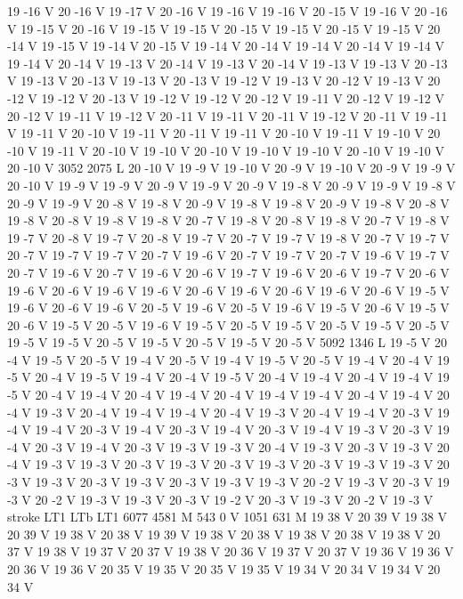 {{19 -16 V
20 -16 V
19 -17 V
20 -16 V
19 -16 V
19 -16 V
20 -15 V
19 -16 V
20 -16 V
19 -15 V
20 -16 V
19 -15 V
19 -15 V
20 -15 V
19 -15 V
20 -15 V
19 -15 V
20 -14 V
19 -15 V
19 -14 V
20 -15 V
19 -14 V
20 -14 V
19 -14 V
20 -14 V
19 -14 V
19 -14 V
20 -14 V
19 -13 V
20 -14 V
19 -13 V
20 -14 V
19 -13 V
19 -13 V
20 -13 V
19 -13 V
20 -13 V
19 -13 V
20 -13 V
19 -12 V
19 -13 V
20 -12 V
19 -13 V
20 -12 V
19 -12 V
20 -13 V
19 -12 V
19 -12 V
20 -12 V
19 -11 V
20 -12 V
19 -12 V
20 -12 V
19 -11 V
19 -12 V
20 -11 V
19 -11 V
20 -11 V
19 -12 V
20 -11 V
19 -11 V
19 -11 V
20 -10 V
19 -11 V
20 -11 V
19 -11 V
20 -10 V
19 -11 V
19 -10 V
20 -10 V
19 -11 V
20 -10 V
19 -10 V
20 -10 V
19 -10 V
19 -10 V
20 -10 V
19 -10 V
20 -10 V
3052 2075 L
20 -10 V
19 -9 V
19 -10 V
20 -9 V
19 -10 V
20 -9 V
19 -9 V
20 -10 V
19 -9 V
19 -9 V
20 -9 V
19 -9 V
20 -9 V
19 -8 V
20 -9 V
19 -9 V
19 -8 V
20 -9 V
19 -9 V
20 -8 V
19 -8 V
20 -9 V
19 -8 V
19 -8 V
20 -9 V
19 -8 V
20 -8 V
19 -8 V
20 -8 V
19 -8 V
19 -8 V
20 -7 V
19 -8 V
20 -8 V
19 -8 V
20 -7 V
19 -8 V
19 -7 V
20 -8 V
19 -7 V
20 -8 V
19 -7 V
20 -7 V
19 -7 V
19 -8 V
20 -7 V
19 -7 V
20 -7 V
19 -7 V
19 -7 V
20 -7 V
19 -6 V
20 -7 V
19 -7 V
20 -7 V
19 -6 V
19 -7 V
20 -7 V
19 -6 V
20 -7 V
19 -6 V
20 -6 V
19 -7 V
19 -6 V
20 -6 V
19 -7 V
20 -6 V
19 -6 V
20 -6 V
19 -6 V
19 -6 V
20 -6 V
19 -6 V
20 -6 V
19 -6 V
20 -6 V
19 -5 V
19 -6 V
20 -6 V
19 -6 V
20 -5 V
19 -6 V
20 -5 V
19 -6 V
19 -5 V
20 -6 V
19 -5 V
20 -6 V
19 -5 V
20 -5 V
19 -6 V
19 -5 V
20 -5 V
19 -5 V
20 -5 V
19 -5 V
20 -5 V
19 -5 V
19 -5 V
20 -5 V
19 -5 V
20 -5 V
19 -5 V
20 -5 V
5092 1346 L
19 -5 V
20 -4 V
19 -5 V
20 -5 V
19 -4 V
20 -5 V
19 -4 V
19 -5 V
20 -5 V
19 -4 V
20 -4 V
19 -5 V
20 -4 V
19 -5 V
19 -4 V
20 -4 V
19 -5 V
20 -4 V
19 -4 V
20 -4 V
19 -4 V
19 -5 V
20 -4 V
19 -4 V
20 -4 V
19 -4 V
20 -4 V
19 -4 V
19 -4 V
20 -4 V
19 -4 V
20 -4 V
19 -3 V
20 -4 V
19 -4 V
19 -4 V
20 -4 V
19 -3 V
20 -4 V
19 -4 V
20 -3 V
19 -4 V
19 -4 V
20 -3 V
19 -4 V
20 -3 V
19 -4 V
20 -3 V
19 -4 V
19 -3 V
20 -3 V
19 -4 V
20 -3 V
19 -4 V
20 -3 V
19 -3 V
19 -3 V
20 -4 V
19 -3 V
20 -3 V
19 -3 V
20 -4 V
19 -3 V
19 -3 V
20 -3 V
19 -3 V
20 -3 V
19 -3 V
20 -3 V
19 -3 V
19 -3 V
20 -3 V
19 -3 V
20 -3 V
19 -3 V
20 -3 V
19 -3 V
19 -3 V
20 -2 V
19 -3 V
20 -3 V
19 -3 V
20 -2 V
19 -3 V
19 -3 V
20 -3 V
19 -2 V
20 -3 V
19 -3 V
20 -2 V
19 -3 V
stroke
LT1
LTb
LT1
6077 4581 M
543 0 V
1051 631 M
19 38 V
20 39 V
19 38 V
20 39 V
19 38 V
20 38 V
19 39 V
19 38 V
20 38 V
19 38 V
20 38 V
19 38 V
20 37 V
19 38 V
19 37 V
20 37 V
19 38 V
20 36 V
19 37 V
20 37 V
19 36 V
19 36 V
20 36 V
19 36 V
20 35 V
19 35 V
20 35 V
19 35 V
19 34 V
20 34 V
19 34 V
20 34 V
}}
